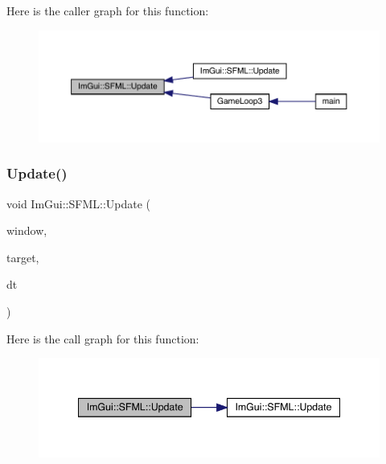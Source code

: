Here is the caller graph for this function\+:
\nopagebreak
\begin{figure}[H]
\begin{center}
\leavevmode
\includegraphics[width=350pt]{d1/d76/namespace_im_gui_1_1_s_f_m_l_a6ac5b3b4d267251063f3697b9fa0ac7d_icgraph}
\end{center}
\end{figure}
\mbox{\label{namespace_im_gui_1_1_s_f_m_l_ad35c61a45ad310ce53f91db317de0244}} 
\subsubsection{\texorpdfstring{Update()}{Update()}\hspace{0.1cm}{\footnotesize\ttfamily [2/3]}}
{\footnotesize\ttfamily void Im\+Gui\+::\+S\+F\+M\+L\+::\+Update (\begin{DoxyParamCaption}\item[{sf\+::\+Window \&}]{window,  }\item[{sf\+::\+Render\+Target \&}]{target,  }\item[{sf\+::\+Time}]{dt }\end{DoxyParamCaption})}

Here is the call graph for this function\+:
\nopagebreak
\begin{figure}[H]
\begin{center}
\leavevmode
\includegraphics[width=341pt]{d1/d76/namespace_im_gui_1_1_s_f_m_l_ad35c61a45ad310ce53f91db317de0244_cgraph}
\end{center}
\end{figure}
\mbox{\label{namespace_im_gui_1_1_s_f_m_l_a23e3d87824f8ec92ec879aa5fda774f4}} 
